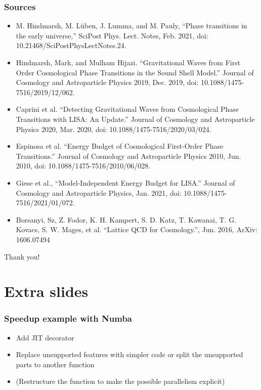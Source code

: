 \begin{frame}
    \frametitle{Sources}
    \begin{itemize}
        \scriptsize
        \item M. Hindmarsh, M. Lüben, J. Lumma, and M. Pauly, “Phase transitions in the early universe,” SciPost Phys. Lect. Notes, Feb. 2021, doi: 10.21468/SciPostPhysLectNotes.24.
        \item Hindmarsh, Mark, and Mulham Hijazi. “Gravitational Waves from First Order Cosmological Phase Transitions in the Sound Shell Model.” Journal of Cosmology and Astroparticle Physics 2019, Dec. 2019, doi: 10.1088/1475-7516/2019/12/062.
        \item Caprini et al. “Detecting Gravitational Waves from Cosmological Phase Transitions with LISA: An Update.” Journal of Cosmology and Astroparticle Physics 2020, Mar. 2020, doi: 10.1088/1475-7516/2020/03/024.
        \item Espinosa et al. “Energy Budget of Cosmological First-Order Phase Transitions.” Journal of Cosmology and Astroparticle Physics 2010, Jun. 2010, doi: 10.1088/1475-7516/2010/06/028.
        \item Giese et al., “Model-Independent Energy Budget for LISA.” Journal of Cosmology and Astroparticle Physics, Jan. 2021, doi: 10.1088/1475-7516/2021/01/072.
        \item Borsanyi, Sz, Z. Fodor, K. H. Kampert, S. D. Katz, T. Kawanai, T. G. Kovacs, S. W. Mages, et al. “Lattice QCD for Cosmology.”, Jun. 2016, ArXiv: 1606.07494
    \end{itemize}
\end{frame}

\begin{frame}
    Thank you!
\end{frame}

\section{Extra slides}

\begin{frame}
    \frametitle{Speedup example with Numba}
    \begin{itemize}
        \item Add JIT decorator
        \item Replace unsupported features with simpler code or split the unsupported parts to another function
        \item (Restructure the function to make the possible parallelism explicit)
    \end{itemize}
    {
        \footnotesize
        
    }
\end{frame}
